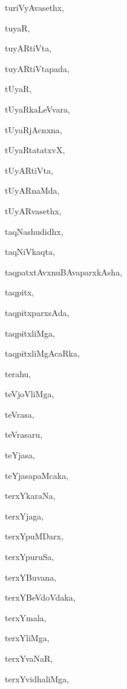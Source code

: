 \begin{multicols}{2}
{turiVyAvasethx}, \pageref{turiVyAvasethx}

{tuyaR}, \pageref{tuyaR}

{tuyARtiVta}, \pageref{tuyARtiVta}

{tuyARtiVtapada}, \pageref{tuyARtiVtapada}

{tUyaR}, \pageref{tUyaR}

{tUyaRkaLeVvara}, \pageref{tUyaRkaLeVvara}

{tUyaRjAcnxna}, \pageref{tUyaRjAcnxna}

{tUyaRtatatxvX}, \pageref{tUyaRtatatxvX}

{tUyARtiVta}, \pageref{tUyARtiVta}

{tUyARnaMda}, \pageref{tUyARnaMda}

{tUyARvasethx}, \pageref{tUyARvasethx}

{taqNashudidhx}, \pageref{taqNashudidhx}

{taqNiVkaqta}, \pageref{taqNiVkaqta}

{taqpatxtAvxnuBAvaparxkAsha}, \pageref{taqpatxtAvxnuBAvaparxkAsha}

{taqpitx}, \pageref{taqpitx}

{taqpitxparxsAda}, \pageref{taqpitxparxsAda}

{taqpitxliMga}, \pageref{taqpitxliMga}

{taqpitxliMgAcaRka}, \pageref{taqpitxliMgAcaRka}

{terahu}, \pageref{terahu}

{teVjoVliMga}, \pageref{teVjoVliMga}

{teVrasa}, \pageref{teVrasa}

{teVrasaru}, \pageref{teVrasaru}

{teYjasa}, \pageref{teYjasa}

{teYjasapaMcaka}, \pageref{teYjasapaMcaka}

{terxYkaraNa}, \pageref{terxYkaraNa}

{terxYjaga}, \pageref{terxYjaga}

{terxYpuMDarx}, \pageref{terxYpuMDarx}

{terxYpuruSa}, \pageref{terxYpuruSa}

{terxYBuvana}, \pageref{terxYBuvana}

{terxYBeVdoVdaka}, \pageref{terxYBeVdoVdaka}

{terxYmala}, \pageref{terxYmala}

{terxYliMga}, \pageref{terxYliMga2}

{terxYvaNaR}, \pageref{terxYvaNaR}

{terxYvidhaliMga}, \pageref{terxYvidhaliMga}


\end{multicols}
